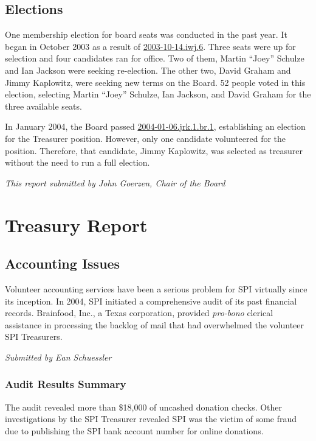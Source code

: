 \documentclass[letterpaper]{report}
\begin{document}
\section{Elections}

One membership election for board seats was conducted in the past
year. It began in October 2003 as a result of \href{http://lists.spi-inc.org/pipermail/spi-announce/2003/000057.html}{2003-10-14.iwj.6}.
Three seats were up for selection and four candidates ran for office.
Two of them, Martin ``Joey'' Schulze and Ian Jackson were seeking
re-election. The other two, David Graham and Jimmy Kaplowitz, were
seeking new terms on the Board. 52 people voted in this election,
selecting Martin ``Joey'' Schulze, Ian Jackson, and David Graham
for the three available seats.

In January 2004, the Board passed \href{http://lists.spi-inc.org/pipermail/spi-announce/2004/000069.html}{2004-01-06.jrk.1.br.1},
establishing an election for the Treasurer position. However, only
one candidate volunteered for the position. Therefore, that candidate,
Jimmy Kaplowitz, was selected as treasurer without the need to run
a full election.

\emph{This report submitted by John Goerzen, Chair of the Board}


\chapter{Treasury Report}


\section{Accounting Issues}

Volunteer accounting services have been a serious problem for SPI
virtually since its inception. In 2004, SPI initiated a comprehensive
audit of its past financial records. Brainfood, Inc., a Texas corporation,
provided \emph{pro-bono} clerical assistance in processing the backlog
of mail that had overwhelmed the volunteer SPI Treasurers.

\emph{Submitted by Ean Schuessler}


\subsection{Audit Results Summary}

The audit revealed more than \$18,000 of uncashed donation checks.
Other investigations by the SPI Treasurer revealed SPI was the victim
of some fraud due to publishing the SPI bank account number for online
donations.
\end{document}
